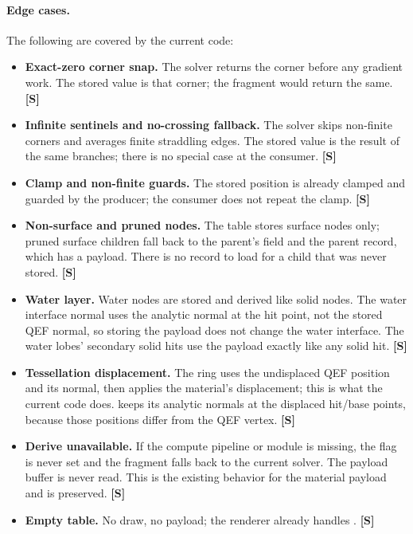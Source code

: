 \documentclass[11pt,a4paper]{article}
\newcommand{\evS}{\textsf{\textbf{\color{evS}[S]}}}
\newcommand{\code}[1]{\texttt{\detokenize{#1}}}
\theoremstyle{plain}
\theoremstyle{definition}
\theoremstyle{remark}
\begin{document}
\paragraph{Edge cases.} The following are covered by the current code:
\begin{itemize}[leftmargin=1.3em,itemsep=2pt]
\item \textbf{Exact-zero corner snap.} The solver returns the corner before
      any gradient work. The stored value is that corner; the fragment would
      return the same. \evS
\item \textbf{Infinite sentinels and no-crossing fallback.} The solver skips
      non-finite corners and averages finite straddling edges. The stored
      value is the result of the same branches; there is no special case at
      the consumer. \evS
\item \textbf{Clamp and non-finite guards.} The stored position is already
      clamped and guarded by the producer; the consumer does not repeat the
      clamp. \evS
\item \textbf{Non-surface and pruned nodes.} The table stores surface nodes
      only; pruned surface children fall back to the parent's field and the
      parent record, which has a payload. There is no record to load for a
      child that was never stored. \evS
\item \textbf{Water layer.} Water nodes are stored and derived like solid
      nodes. The water interface normal uses the analytic normal at the hit
      point, not the stored QEF normal, so storing the payload does not change
      the water interface. The water lobes' secondary solid hits use the
      payload exactly like any solid hit. \evS
\item \textbf{Tessellation displacement.} The ring uses the undisplaced QEF
      position and its normal, then applies the material's displacement; this
      is what the current code does. \code{rmResolveHitShading} keeps its
      analytic normals at the displaced hit/base points, because those
      positions differ from the QEF vertex. \evS
\item \textbf{Derive unavailable.} If the compute pipeline or module is
      missing, the flag is never set and the fragment falls back to the
      current solver. The payload buffer is never read. This is the existing
      behavior for the material payload and is preserved. \evS
\item \textbf{Empty table.} No draw, no payload; the renderer already handles
      \code{rootCounts_ == 0}. \evS
\end{itemize}
\end{document}
